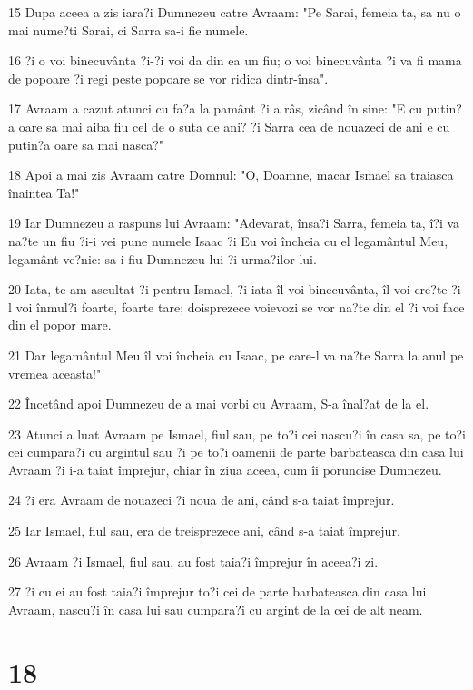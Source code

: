 \par 15 Dupa aceea a zis iara?i Dumnezeu catre Avraam: "Pe Sarai, femeia ta, sa nu o mai nume?ti Sarai, ci Sarra sa-i fie numele.
\par 16 ?i o voi binecuvânta ?i-?i voi da din ea un fiu; o voi binecuvânta ?i va fi mama de popoare ?i regi peste popoare se vor ridica dintr-însa".
\par 17 Avraam a cazut atunci cu fa?a la pamânt ?i a râs, zicând în sine: "E cu putin?a oare sa mai aiba fiu cel de o suta de ani? ?i Sarra cea de nouazeci de ani e cu putin?a oare sa mai nasca?"
\par 18 Apoi a mai zis Avraam catre Domnul: "O, Doamne, macar Ismael sa traiasca înaintea Ta!"
\par 19 Iar Dumnezeu a raspuns lui Avraam: "Adevarat, însa?i Sarra, femeia ta, î?i va na?te un fiu ?i-i vei pune numele Isaac ?i Eu voi încheia cu el legamântul Meu, legamânt ve?nic: sa-i fiu Dumnezeu lui ?i urma?ilor lui.
\par 20 Iata, te-am ascultat ?i pentru Ismael, ?i iata îl voi binecuvânta, îl voi cre?te ?i-l voi înmul?i foarte, foarte tare; doisprezece voievozi se vor na?te din el ?i voi face din el popor mare.
\par 21 Dar legamântul Meu îl voi încheia cu Isaac, pe care-l va na?te Sarra la anul pe vremea aceasta!"
\par 22 Încetând apoi Dumnezeu de a mai vorbi cu Avraam, S-a înal?at de la el.
\par 23 Atunci a luat Avraam pe Ismael, fiul sau, pe to?i cei nascu?i în casa sa, pe to?i cei cumpara?i cu argintul sau ?i pe to?i oamenii de parte barbateasca din casa lui Avraam ?i i-a taiat împrejur, chiar în ziua aceea, cum îi poruncise Dumnezeu.
\par 24 ?i era Avraam de nouazeci ?i noua de ani, când s-a taiat împrejur.
\par 25 Iar Ismael, fiul sau, era de treisprezece ani, când s-a taiat împrejur.
\par 26 Avraam ?i Ismael, fiul sau, au fost taia?i împrejur în aceea?i zi.
\par 27 ?i cu ei au fost taia?i împrejur to?i cei de parte barbateasca din casa lui Avraam, nascu?i în casa lui sau cumpara?i cu argint de la cei de alt neam.

\chapter{18}

